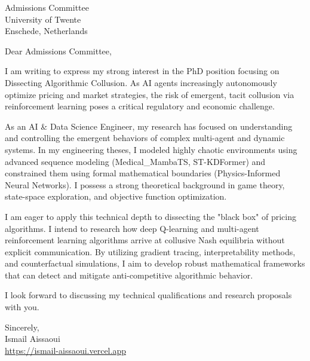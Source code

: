 \documentclass[11pt, a4paper]{letter}
\begin{document}
\begin{letter}{Admissions Committee \\ University of Twente \\ Enschede, Netherlands}
\opening{Dear Admissions Committee,}

I am writing to express my strong interest in the PhD position focusing on Dissecting Algorithmic Collusion. As AI agents increasingly autonomously optimize pricing and market strategies, the risk of emergent, tacit collusion via reinforcement learning poses a critical regulatory and economic challenge.

As an AI \& Data Science Engineer, my research has focused on understanding and controlling the emergent behaviors of complex multi-agent and dynamic systems. In my engineering theses, I modeled highly chaotic environments using advanced sequence modeling (Medical\_MambaTS, ST-KDFormer) and constrained them using formal mathematical boundaries (Physics-Informed Neural Networks). I possess a strong theoretical background in game theory, state-space exploration, and objective function optimization.

I am eager to apply this technical depth to dissecting the "black box" of pricing algorithms. I intend to research how deep Q-learning and multi-agent reinforcement learning algorithms arrive at collusive Nash equilibria without explicit communication. By utilizing gradient tracing, interpretability methods, and counterfactual simulations, I aim to develop robust mathematical frameworks that can detect and mitigate anti-competitive algorithmic behavior.

I look forward to discussing my technical qualifications and research proposals with you.

\closing{Sincerely, \\ Ismail Aissaoui \\ \href{https://ismail-aissaoui.vercel.app}{https://ismail-aissaoui.vercel.app}}
\end{letter}
\end{document}
